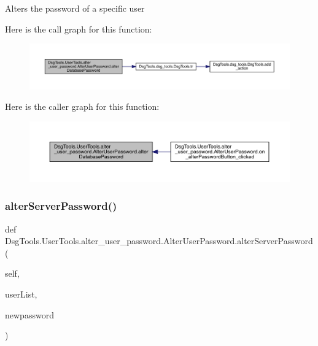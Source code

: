 \begin{DoxyVerb}Alters the password of a specific user
\end{DoxyVerb}
 Here is the call graph for this function\+:
\nopagebreak
\begin{figure}[H]
\begin{center}
\leavevmode
\includegraphics[width=350pt]{class_dsg_tools_1_1_user_tools_1_1alter__user__password_1_1_alter_user_password_a5d124954fbc84be38fc2bca0975280da_cgraph}
\end{center}
\end{figure}
Here is the caller graph for this function\+:
\nopagebreak
\begin{figure}[H]
\begin{center}
\leavevmode
\includegraphics[width=350pt]{class_dsg_tools_1_1_user_tools_1_1alter__user__password_1_1_alter_user_password_a5d124954fbc84be38fc2bca0975280da_icgraph}
\end{center}
\end{figure}
\mbox{\label{class_dsg_tools_1_1_user_tools_1_1alter__user__password_1_1_alter_user_password_afb5ca38a136f5c87ae6db893dc7bc697}} 
\subsubsection{\texorpdfstring{alter\+Server\+Password()}{alterServerPassword()}}
{\footnotesize\ttfamily def Dsg\+Tools.\+User\+Tools.\+alter\+\_\+user\+\_\+password.\+Alter\+User\+Password.\+alter\+Server\+Password (\begin{DoxyParamCaption}\item[{}]{self,  }\item[{}]{user\+List,  }\item[{}]{newpassword }\end{DoxyParamCaption})}

